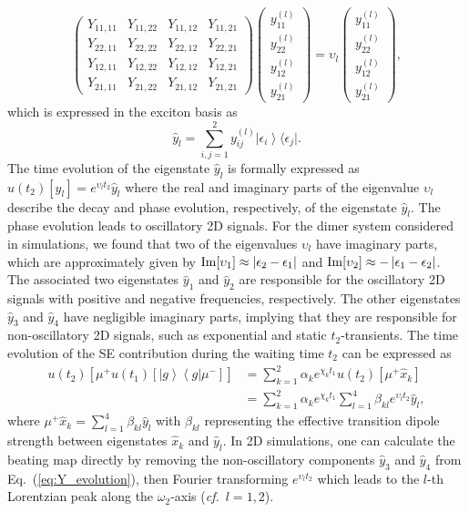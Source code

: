 \documentclass[%
 reprint,%
 amssymb, amsmath,%
 aip,cha,%
]{revtex4-1}
\newcommand{\bra}[1]{\ensuremath{\left\langle{#1}\right\vert}}
\newcommand{\ket}[1]{\ensuremath{\left|{#1}\right\rangle}}
\newcommand{\abs}[1]{\left|#1\right|}
\begin{document}
\begin{equation}
\begin{pmatrix}
	Y_{11,11} & Y_{11,22} & Y_{11,12} & Y_{11,21} \\
	Y_{22,11} & Y_{22,22} & Y_{22,12} & Y_{22,21} \\
	Y_{12,11} & Y_{12,22} & Y_{12,12} & Y_{12,21} \\
	Y_{21,11} & Y_{21,22} & Y_{21,12} & Y_{21,21}
\end{pmatrix}
\begin{pmatrix}
	y_{11}^{(l)} \\ y_{22}^{(l)} \\ y_{12}^{(l)} \\ y_{21}^{(l)}
\end{pmatrix}
=
\upsilon_l
\begin{pmatrix}
	y_{11}^{(l)} \\ y_{22}^{(l)} \\ y_{12}^{(l)} \\ y_{21}^{(l)}
\end{pmatrix},
\end{equation}
which is expressed in the exciton basis as
\begin{equation}
	\hat{y}_l=\sum_{i,j=1}^{2}y_{ij}^{(l)}\ket{\epsilon_i}\mathrm{\langle}\epsilon_j\mathrm{|}.
\end{equation}
The time evolution of the eigenstate $\hat{y}_l$ is formally expressed as $u(t_2)[\hat{y}_l]=e^{\upsilon_l t_2}\hat{y}_l$ where the real and imaginary parts of the eigenvalue $\upsilon_l$ describe the decay and phase evolution, respectively, of the eigenstate $\hat{y}_l$. The phase evolution leads to oscillatory 2D signals. For the dimer system considered in simulations, we found that two of the eigenvalues $\upsilon_l$ have imaginary parts, which are approximately given by ${\rm Im}[\upsilon_1]\approx\abs{\epsilon_2-\epsilon_1}$ and ${\rm Im}[\upsilon_2]\approx-\abs{\epsilon_1-\epsilon_2}$. The associated two eigenstates $\hat{y}_1$ and $\hat{y}_2$ are responsible for the oscillatory 2D signals with positive and negative frequencies, respectively. The other eigenstates $\hat{y}_3$ and $\hat{y}_4$ have negligible imaginary parts, implying that they are responsible for non-oscillatory 2D signals, such as exponential and static $t_2$-transients. The time evolution of the SE contribution during the waiting time $t_2$ can be expressed as
\begin{align}
	u(t_2)[\mu^{+}u(t_1)[\ket{g}\bra{g}\mu^{-}]]&=\sum_{k=1}^{2}\alpha_{k}e^{\chi_{k}t_1}u(t_2)[\mu^{+}\hat{x}_{k}]\\
	&=\sum_{k=1}^{2}\alpha_{k}e^{\chi_{k}t_1}\sum_{l=1}^{4}\beta_{kl}e^{\upsilon_l t_2}\hat{y}_{l},\label{eq:Y_evolution}
\end{align}
where $\mu^{+}\hat{x}_{k}=\sum_{l=1}^{4}\beta_{kl}\hat{y}_{l}$ with $\beta_{kl}$ representing the effective transition dipole strength between eigenstates $\hat{x}_{k}$ and $\hat{y}_{l}$. In 2D simulations, one can calculate the beating map directly by removing the non-oscillatory components $\hat{y}_3$ and $\hat{y}_4$ from Eq.~(\ref{eq:Y_evolution}), then Fourier transforming $e^{\upsilon_l t_2}$ which leads to the $l$-th Lorentzian peak along the $\omega_2$-axis ({\it cf.}~$l=1,2$).
\end{document}
